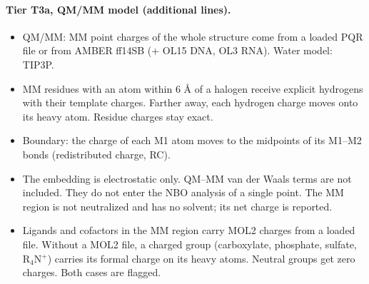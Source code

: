 \paragraph{Tier T3a, QM/MM model (additional lines).}
\begin{itemize}[nosep,leftmargin=*]
\item QM/MM: MM point charges of the whole structure come from a loaded PQR file or from AMBER ff14SB (+ OL15 DNA, OL3 RNA). Water model: TIP3P.
\item MM residues with an atom within 6 \AA{} of a halogen receive explicit hydrogens with their template charges. Farther away, each hydrogen charge moves onto its heavy atom. Residue charges stay exact.
\item Boundary: the charge of each M1 atom moves to the midpoints of its M1--M2 bonds (redistributed charge, RC).
\item The embedding is electrostatic only. QM--MM van der Waals terms are not included. They do not enter the NBO analysis of a single point. The MM region is not neutralized and has no solvent; its net charge is reported.
\item Ligands and cofactors in the MM region carry MOL2 charges from a loaded file. Without a MOL2 file, a charged group (carboxylate, phosphate, sulfate, R$_4$N$^+$) carries its formal charge on its heavy atoms. Neutral groups get zero charges. Both cases are flagged.
\end{itemize}
